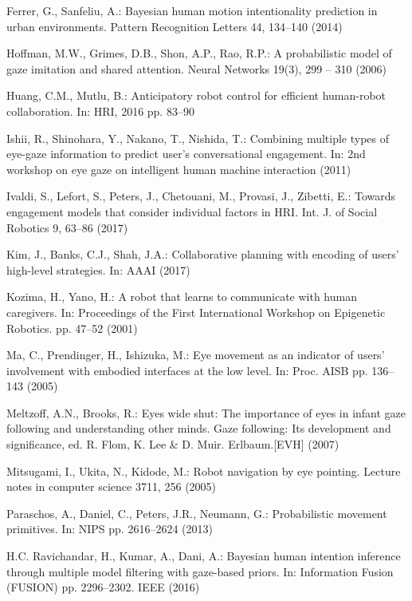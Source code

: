 \documentclass[runningheads,a4paper]{llncs}
\begin{document}
\begin{thebibliography}{4}
Ferrer, G., Sanfeliu, A.: Bayesian human motion intentionality prediction in
  urban environments. Pattern Recognition Letters  44,  134--140 (2014)

Hoffman, M.W., Grimes, D.B., Shon, A.P., Rao, R.P.: A probabilistic model of
  gaze imitation and shared attention. Neural Networks  19(3),  299 -- 310
  (2006)

Huang, C.M., Mutlu, B.: Anticipatory robot control for efficient human-robot
  collaboration. In: HRI, 2016 pp. 83--90

Ishii, R., Shinohara, Y., Nakano, T., Nishida, T.: Combining multiple types of
  eye-gaze information to predict user's conversational engagement. In: 2nd
  workshop on eye gaze on intelligent human machine interaction (2011)

Ivaldi, S., Lefort, S., Peters, J., Chetouani, M., Provasi, J., Zibetti, E.:
  Towards engagement models that consider individual factors in HRI. Int. J. of Social
  Robotics  9,  63--86 (2017)

Kim, J., Banks, C.J., Shah, J.A.: Collaborative planning with encoding of
  users' high-level strategies. In: AAAI (2017)

Kozima, H., Yano, H.: A robot that learns to communicate with human caregivers.
  In: Proceedings of the First International Workshop on Epigenetic Robotics.
  pp. 47--52 (2001)

Ma, C., Prendinger, H., Ishizuka, M.: Eye movement as an indicator of users'
  involvement with embodied interfaces at the low level. In: Proc. AISB
 pp.  136--143 (2005)

Meltzoff, A.N., Brooks, R.: Eyes wide shut: The importance of eyes in infant
  gaze following and understanding other minds. Gaze following: Its development
  and significance, ed. R. Flom, K. Lee \& D. Muir. Erlbaum.[EVH]  (2007)

Mitsugami, I., Ukita, N., Kidode, M.: Robot navigation by eye pointing. Lecture
  notes in computer science  3711,  256 (2005)

Paraschos, A., Daniel, C., Peters, J.R., Neumann, G.: Probabilistic movement
  primitives. In: NIPS pp.
  2616--2624 (2013)

H.C. Ravichandar, H., Kumar, A., Dani, A.: Bayesian human intention
  inference through multiple model filtering with gaze-based priors. In:
  Information Fusion (FUSION) pp.
  2296--2302. IEEE (2016)


\end{thebibliography}
\end{document}
